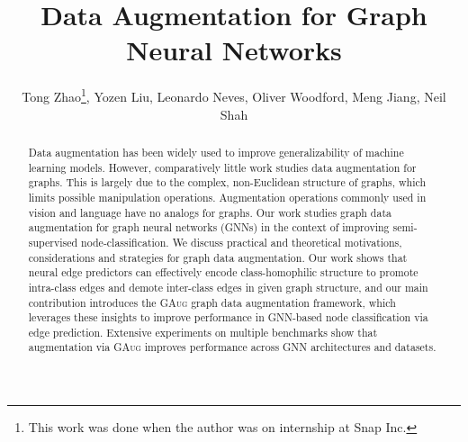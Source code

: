 \documentclass[letterpaper]{article} \usepackage{aaai21}  \usepackage{times}  \usepackage{helvet} \usepackage{courier}  \usepackage[hyphens]{url}  \usepackage{graphicx} \urlstyle{rm} \def\UrlFont{\rm}  \usepackage{natbib}  \usepackage{caption} \frenchspacing  \setlength{\pdfpagewidth}{8.5in}  \setlength{\pdfpageheight}{11in}
\title{Data Augmentation for Graph Neural Networks}
\author {
Tong Zhao\textsuperscript{\dag}\footnote{This work was done when the author was on internship at Snap Inc.},
    Yozen Liu\textsuperscript{\ddag},
    Leonardo Neves\textsuperscript{\ddag},
    Oliver Woodford\textsuperscript{\ddag},
    Meng Jiang\textsuperscript{\dag},
    Neil Shah\textsuperscript{\ddag}
    \\
}
\begin{document}
\maketitle

\newcommand{\methodtwo}{\textsc{GAug-M}\xspace}
\newcommand{\method}{\textsc{GAug-O}\xspace}
\newcommand{\methodshared}{\textsc{GAug}\xspace}

\newcommand{\cora}{\textsc{Cora}\xspace}
\newcommand{\citeseer}{\textsc{Citeseer}\xspace}
\newcommand{\pubmed}{\textsc{Pubmed}\xspace}
\newcommand{\ppi}{\textsc{PPI}\xspace}
\newcommand{\amazon}{\textsc{Amazon}\xspace}
\newcommand{\blogc}{\textsc{BlogCatalog}\xspace}
\newcommand{\flickr}{\textsc{Flickr}\xspace}
\newcommand{\airusa}{\textsc{Air-USA}\xspace}
\newcommand{\ogbn}{\textsc{OGBn-Arxiv}\xspace}

\newcommand{\gcn}{\textsc{GCN}\xspace}
\newcommand{\gsage}{\textsc{GSAGE}\xspace}
\newcommand{\gat}{\textsc{GAT}\xspace}
\newcommand{\jknet}{\textsc{JK-Net}\xspace}

\newcommand{\dropedge}{\textsc{DropEdge}\xspace}
\newcommand{\adaedge}{\textsc{AdaEdge}\xspace}
\newcommand{\bgcn}{\textsc{BGCN}\xspace}

\newcommand\neil[1]{\textcolor{red}{[Neil: #1]}}
\newcommand\ns[1]{\textcolor{red}{[Neil: #1]}}
\newcommand\tong[1]{\textcolor{cyan}{[Tong: #1]}}
\newcommand{\yl}[1]{\textcolor{purple}{[YL: #1]}}

 
\begin{abstract}
Data augmentation has been widely used to improve generalizability of machine learning models.  However, comparatively little work studies data augmentation for graphs.  This is largely due to the complex, non-Euclidean structure of graphs, which limits possible manipulation operations. Augmentation operations commonly used in vision and language have no analogs for graphs.  Our work studies graph data augmentation for graph neural networks (GNNs) in the context of improving semi-supervised node-classification.  We discuss practical and theoretical motivations, considerations and strategies for graph data augmentation.  Our work shows that neural edge predictors can effectively encode class-homophilic structure to promote intra-class edges and demote inter-class edges in given graph structure, and our main contribution introduces the \methodshared graph data augmentation framework, which leverages these insights to improve performance in GNN-based node classification via edge prediction. Extensive experiments on multiple benchmarks show that augmentation via \methodshared improves performance across GNN architectures and datasets.

%
 \end{abstract}
\end{document}
